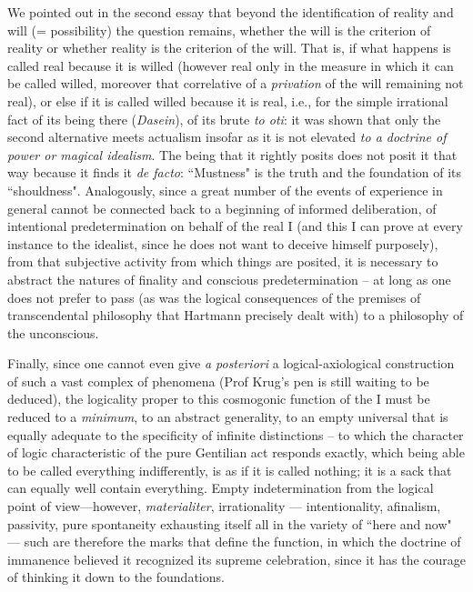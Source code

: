 We pointed out in the second essay that beyond the identification of reality and will (= possibility) the question remains, whether the will is the criterion of reality or whether reality is the criterion of the will. That is, if what happens is called real because it is willed (however real only in the measure in which it can be called willed, moreover that correlative of a \emph{privation} of the will remaining not real), or else if it is called willed because it is real, i.e., for the simple irrational fact of its being there (\emph{Dasein}), of its brute \emph{to oti}: it was shown that only the second alternative meets actualism insofar as it is not elevated \emph{to a doctrine of power or magical idealism}. The being that it rightly posits does not posit it that way because it finds it \emph{de facto}: ``Mustness" is the truth and the foundation of its ``shouldness". Analogously, since a great number of the events of experience in general cannot be connected back to a beginning of informed deliberation, of intentional predetermination on behalf of the real I (and this I can prove at every instance to the idealist, since he does not want to deceive himself purposely), from that subjective activity from which things are posited, it is necessary to abstract the natures of finality and conscious predetermination – at long as one does not prefer to pass (as was the logical consequences of the premises of transcendental philosophy that Hartmann precisely dealt with) to a philosophy of the unconscious.

Finally, since one cannot even give \emph{a posteriori} a logical-axiological construction of such a vast complex of phenomena (Prof Krug's pen is still waiting to be deduced), the logicality proper to this cosmogonic function of the I must be reduced to a \emph{minimum}, to an abstract generality, to an empty universal that is equally adequate to the specificity of infinite distinctions – to which the character of logic characteristic of the pure Gentilian act responds exactly, which being able to be called everything indifferently, is as if it is called nothing; it is a sack that can equally well contain everything. Empty indetermination from the logical point of view—however, \emph{materialiter}, irrationality — intentionality, afinalism, passivity, pure spontaneity exhausting itself all in the variety of ``here and now" — such are therefore the marks that define the function, in which the doctrine of immanence believed it recognized its supreme celebration, since it has the courage of thinking it down to the foundations.

